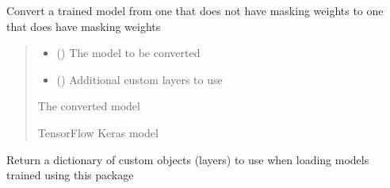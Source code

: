 \documentclass[letterpaper,10pt,english]{sphinxmanual}
\begin{document}
\begin{fulllineitems}
\label{\detokenize{beyondml.tflow.utils:beyondml.tflow.utils.utils.add_layer_masks}}
\pysigstartsignatures
{}
\pysigstopsignatures
\sphinxAtStartPar
Convert a trained model from one that does not have masking weights to one that does have
masking weights
\begin{quote}\begin{description}
\begin{itemize}
\item {} 
\sphinxAtStartPar
{} () \textendash{} The model to be converted

\item {} 
\sphinxAtStartPar
{} (\sphinxstyleliteralemphasis{\sphinxupquote{ (}}\sphinxstyleliteralemphasis{\sphinxupquote{)}}) \textendash{} Additional custom layers to use

\end{itemize}

\sphinxAtStartPar
{} \textendash{} The converted model

\sphinxAtStartPar
TensorFlow Keras model

\end{description}\end{quote}

\end{fulllineitems}


\begin{fulllineitems}
\label{\detokenize{beyondml.tflow.utils:beyondml.tflow.utils.utils.get_custom_objects}}
\pysigstartsignatures
{}
\pysigstopsignatures
\sphinxAtStartPar
Return a dictionary of custom objects (layers) to use when loading models trained using this package

\end{fulllineitems}
\end{document}
